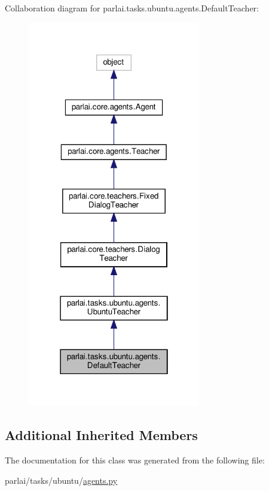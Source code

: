 Collaboration diagram for parlai.\+tasks.\+ubuntu.\+agents.\+Default\+Teacher\+:
\nopagebreak
\begin{figure}[H]
\begin{center}
\leavevmode
\includegraphics[width=214pt]{classparlai_1_1tasks_1_1ubuntu_1_1agents_1_1DefaultTeacher__coll__graph}
\end{center}
\end{figure}
\subsection*{Additional Inherited Members}


The documentation for this class was generated from the following file\+:\begin{DoxyCompactItemize}
\item 
parlai/tasks/ubuntu/\hyperlink{parlai_2tasks_2ubuntu_2agents_8py}{agents.\+py}\end{DoxyCompactItemize}
